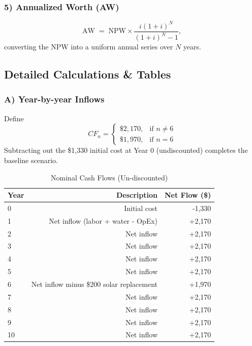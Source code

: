 \documentclass[12pt]{report}
\begin{document}
\subsubsection{5) Annualized Worth (AW)}
\begin{equation}
    \text{AW} \;=\; \text{NPW} \times \frac{i(1+i)^N}{(1+i)^N - 1},
    \tag{Eq.~A5}
\end{equation}
\noindent converting the NPW into a uniform annual series over \(N\) years.

\newpage
\subsection{Detailed Calculations \& Tables}

\subsubsection{A) Year-by-year Inflows}
Define
\[
CF_n = 
\begin{cases}
    \$2,170, & \text{if }n \neq 6 \\
    \$1,970, & \text{if }n = 6
\end{cases}
\]
Subtracting out the \$1,330 initial cost at Year 0 (undiscounted) completes the baseline scenario.

\begin{table}[h]
\centering
\caption{Nominal Cash Flows (Un-discounted)}
\label{tab:nominalCF}
\begin{tabular}{@{}lrr@{}}
\toprule
\textbf{Year} & \textbf{Description} & \textbf{Net Flow (\$)} \\
\midrule
0 & Initial cost & -1,330 \\
1 & Net inflow (labor + water - OpEx) & +2,170 \\
2 & Net inflow & +2,170 \\
3 & Net inflow & +2,170 \\
4 & Net inflow & +2,170 \\
5 & Net inflow & +2,170 \\
6 & Net inflow minus \$200 solar replacement & +1,970 \\
7 & Net inflow & +2,170 \\
8 & Net inflow & +2,170 \\
9 & Net inflow & +2,170 \\
10 & Net inflow & +2,170 \\
\bottomrule
\end{tabular}
\end{table}
\end{document}
